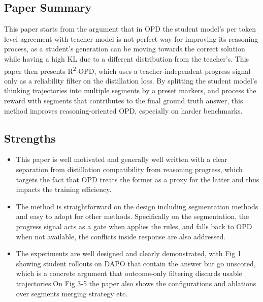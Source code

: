 \documentclass[11pt,a4paper]{article}
\begin{document}
\subsection*{Paper Summary}
This paper starts from the argument that in OPD the student model's per token level agreement with teacher model is not perfect way for improving its reasoning process, as a student's generation can be moving towards the correct solution while having a high KL due to a different distribution from the teacher's. This paper then presents R\textsuperscript{2}-OPD, which uses a teacher-independent progress signal only as a reliability filter on the distillation loss. By splitting the student model's thinking trajectories into multiple segments by a preset markers, and process the reward with segments that contributes to the final ground truth answer, this method improves reasoning-oriented OPD, especially on harder benchmarks.

\subsection*{Strengths}
\begin{itemize}
\item This paper is well motivated and generally well written with a clear separation from distillation compatibility from reasoning progress, which targets the fact that OPD treats the former as a proxy for the latter and thus impacts the training efficiency.
\item The method is straightforward on the design including segmentation methods and easy to adopt for other methods. Specifically on the segmentation, the progress signal acts as a gate when applies the rules, and falls back to OPD when not available, the conflicts inside response are also addressed.
\item The experiments are well designed and clearly demonstrated, with Fig 1 showing student rollouts on DAPO that contain the answer but go unscored, which is a concrete argument that outcome-only filtering discards usable trajectories.On Fig 3-5 the paper also shows the configurations and ablations over segments merging strategy etc.
\end{itemize}
\end{document}
